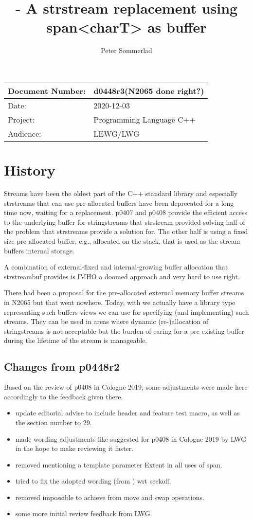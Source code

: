\documentclass[ebook,11pt,article]{memoir}
\title{\papernumber{} - A strstream replacement using span\textless{}charT\textgreater{} as buffer}
\author{Peter Sommerlad}
\date{\paperdate}                %
\newcommand{\papernumber}{d0448r3}
\newcommand{\paperdate}{2020-12-03}
\begin{document}
\maketitle
\begin{center}
\begin{tabular}[t]{|l|l|}\hline 
Document Number:&  \papernumber \hfill (N2065 done right?)\\\hline
Date: & \paperdate \\\hline
Project: & Programming Language C++\\\hline 
Audience: & LEWG/LWG\\\hline
\end{tabular}
\end{center}
\chapter{History}
Streams have been the oldest part of the C++ standard library and especially strstreams that can use pre-allocated buffers have been deprecated for a long time now, waiting for a replacement. p0407 and p0408 provide the efficient access to the underlying buffer for stringstreams that strstream provided solving half of the problem that strstreams provide a solution for. The other half is using a fixed size pre-allocated buffer, e.g., allocated on the stack, that is used as the stream buffers internal storage.

A combination of external-fixed and internal-growing buffer allocation that strstreambuf provides is IMHO a doomed approach and very hard to use right.

There had been a proposal for the pre-allocated external memory buffer streams in N2065 but that went nowhere. Today, with  we actually have a library type representing such buffers views we can use for specifying (and implementing) such streams. They can be used in areas where dynamic (re-)allocation of stringstreams is not acceptable but the burden of caring for a pre-existing buffer during the lifetime of the stream is manageable. 

\section{Changes from p0448r2}
Based on the review of p0408 in Cologne 2019, some adjustments were made here accordingly to the feedback given there.
\begin{itemize}
\item update editorial advise to include header and feature test macro, as well as the section number to 29.
\item made wording adjustments like suggested for p0408 in Cologne 2019 by LWG in the hope to make reviewing it faster.
\item removed mentioning a template parameter Extent in all uses of span.
\item tried to fix the adopted wording (from ) wrt seekoff.
\item removed impossible to achieve  from move and swap operations.
\item some more initial review feedback from LWG.
\end{itemize}
\end{document}

